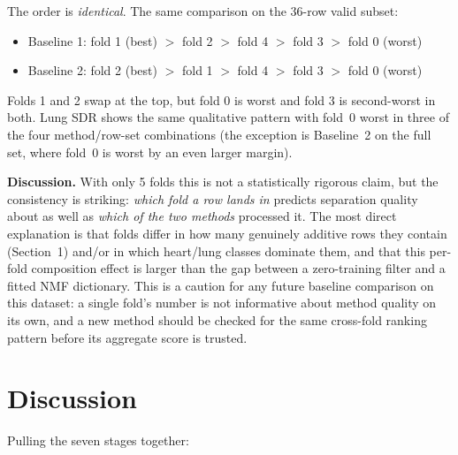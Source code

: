 \documentclass[11pt]{article}
\begin{document}
\noindent The order is \emph{identical}. The same comparison on the 36-row
valid subset:

\begin{itemize}
  \item Baseline 1: fold 1 (best) $>$ fold 2 $>$ fold 4 $>$ fold 3 $>$ fold 0 (worst)
  \item Baseline 2: fold 2 (best) $>$ fold 1 $>$ fold 4 $>$ fold 3 $>$ fold 0 (worst)
\end{itemize}

\noindent Folds 1 and 2 swap at the top, but fold 0 is worst and fold 3 is
second-worst in both. Lung SDR shows the same qualitative pattern with
fold~0 worst in three of the four method/row-set combinations
(the exception is Baseline~2 on the full set, where fold~0 is worst by an
even larger margin).

\textbf{Discussion.} With only 5 folds this is not a statistically rigorous
claim, but the consistency is striking: \emph{which fold a row lands in}
predicts separation quality about as well as \emph{which of the two methods}
processed it. The most direct explanation is that folds differ in how many
genuinely additive rows they contain (Section~1) and/or in which heart/lung
classes dominate them, and that this per-fold composition effect is larger
than the gap between a zero-training filter and a fitted NMF dictionary.
This is a caution for any future baseline comparison on this dataset: a
single fold's number is not informative about method quality on its own,
and a new method should be checked for the same cross-fold ranking pattern
before its aggregate score is trusted.

\section{Discussion}
\label{sec:discussion}

Pulling the seven stages together:
\end{document}
